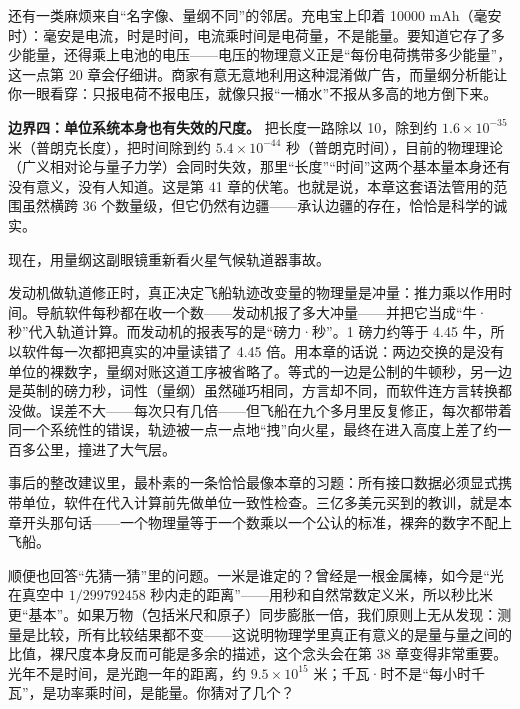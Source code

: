 还有一类麻烦来自“名字像、量纲不同”的邻居。充电宝上印着 10000 mAh（毫安时）：毫安是电流，时是时间，电流乘时间是电荷量，不是能量。要知道它存了多少能量，还得乘上电池的电压——电压的物理意义正是“每份电荷携带多少能量”，这一点第 20 章会仔细讲。商家有意无意地利用这种混淆做广告，而量纲分析能让你一眼看穿：只报电荷不报电压，就像只报“一桶水”不报从多高的地方倒下来。

\textbf{边界四：单位系统本身也有失效的尺度。} 把长度一路除以 10，除到约 $1.6\times10^{-35}$ 米（普朗克长度），把时间除到约 $5.4\times10^{-44}$ 秒（普朗克时间），目前的物理理论（广义相对论与量子力学）会同时失效，那里“长度”“时间”这两个基本量本身还有没有意义，没有人知道。这是第 41 章的伏笔。也就是说，本章这套语法管用的范围虽然横跨 36 个数量级，但它仍然有边疆——承认边疆的存在，恰恰是科学的诚实。


现在，用量纲这副眼镜重新看火星气候轨道器事故。

发动机做轨道修正时，真正决定飞船轨迹改变量的物理量是冲量：推力乘以作用时间。导航软件每秒都在收一个数——发动机报了多大冲量——并把它当成“牛·秒”代入轨道计算。而发动机的报表写的是“磅力·秒”。1 磅力约等于 4.45 牛，所以软件每一次都把真实的冲量读错了 4.45 倍。用本章的话说：两边交换的是没有单位的裸数字，量纲对账这道工序被省略了。等式的一边是公制的牛顿秒，另一边是英制的磅力秒，词性（量纲）虽然碰巧相同，方言却不同，而软件连方言转换都没做。误差不大——每次只有几倍——但飞船在九个多月里反复修正，每次都带着同一个系统性的错误，轨迹被一点一点地“拽”向火星，最终在进入高度上差了约一百多公里，撞进了大气层。

事后的整改建议里，最朴素的一条恰恰最像本章的习题：所有接口数据必须显式携带单位，软件在代入计算前先做单位一致性检查。三亿多美元买到的教训，就是本章开头那句话——一个物理量等于一个数乘以一个公认的标准，裸奔的数字不配上飞船。

顺便也回答“先猜一猜”里的问题。一米是谁定的？曾经是一根金属棒，如今是“光在真空中 $1/299792458$ 秒内走的距离”——用秒和自然常数定义米，所以秒比米更“基本”。如果万物（包括米尺和原子）同步膨胀一倍，我们原则上无从发现：测量是比较，所有比较结果都不变——这说明物理学里真正有意义的是量与量之间的比值，裸尺度本身反而可能是多余的描述，这个念头会在第 38 章变得非常重要。光年不是时间，是光跑一年的距离，约 $9.5\times10^{15}$ 米；千瓦·时不是“每小时千瓦”，是功率乘时间，是能量。你猜对了几个？


